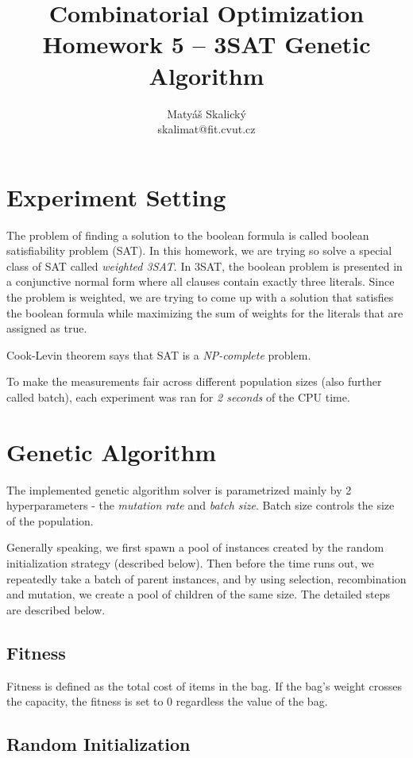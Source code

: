 \documentclass[a4paper,10pt]{article}
\title{Combinatorial Optimization\\Homework 5 – 3SAT Genetic Algorithm}
\author{Matyáš Skalický\\skalimat@fit.cvut.cz}
\begin{document}
\maketitle
\tableofcontents
\medskip

\section{Experiment Setting}
The problem of finding a solution to the boolean formula is called boolean satisfiability problem (SAT). In this homework, we are trying so solve a special class of SAT called \emph{weighted 3SAT}. In 3SAT, the boolean problem is presented in a conjunctive normal form where all clauses contain exactly three literals. Since the problem is weighted, we are trying to come up with a solution that satisfies the boolean formula while maximizing the sum of weights for the literals that are assigned as true.


Cook-Levin theorem says that SAT is a \emph{NP-complete} problem.

To make the measurements fair across different population sizes (also further called batch), each experiment was ran for \emph{2 seconds} of the CPU time.

\section{Genetic Algorithm}

The implemented genetic algorithm solver is parametrized mainly by 2 hyperparameters - the \emph{mutation rate} and \emph{batch size}. Batch size controls the size of the population.

Generally speaking, we first spawn a pool of instances created by the random initialization strategy (described below). Then before the time runs out, we repeatedly take a batch of parent instances, and by using selection, recombination and mutation, we create a pool of children of the same size. The detailed steps are described below.

\subsection{Fitness}

Fitness is defined as the total cost of items in the bag. If the bag's weight crosses the capacity, the fitness is set to $0$ regardless the value of the bag.

\subsection{Random Initialization}
\end{document}
